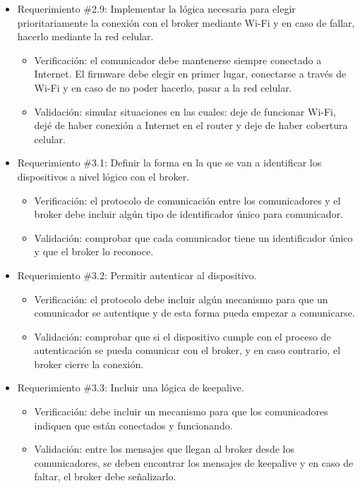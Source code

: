 \documentclass[
11pt, %
]{charter}
\begin{document}
\begin{itemize}
	\item Requerimiento \#2.9: Implementar la lógica necesaria para elegir prioritariamente la conexión con el broker mediante Wi-Fi y en caso de fallar, hacerlo mediante la red celular.
	\begin{itemize}
		\item Verificación: el comunicador debe mantenerse siempre conectado a Internet. El firmware debe elegir en primer lugar, conectarse a través de Wi-Fi y en caso de no poder hacerlo, pasar a la red celular.
		\item Validación: simular situaciones en las cuales: deje de funcionar Wi-Fi, dejé de haber conexión a Internet en el router y deje de haber cobertura celular.
	\end{itemize}
			
	\item Requerimiento \#3.1: Definir la forma en la que se van a identificar los dispositivos a nivel lógico con el broker.
	\begin{itemize}
		\item Verificación: el protocolo de comunicación entre los comunicadores y el broker debe incluir algún tipo de identificador único para comunicador.
		\item Validación: comprobar que cada comunicador tiene un identificador único y que el broker lo reconoce.
	\end{itemize}
			
	\item Requerimiento \#3.2: Permitir autenticar al dispositivo.
	\begin{itemize}
		\item Verificación: el protocolo debe incluir algún mecanismo para que un comunicador se autentique y de esta forma pueda empezar a comunicarse.
		\item Validación: comprobar que si el dispositivo cumple con el proceso de autenticación se pueda comunicar con el broker, y en caso contrario, el broker cierre la conexión.
	\end{itemize}
			
	\item Requerimiento \#3.3: Incluir una lógica de keepalive.
	\begin{itemize}
		\item Verificación: debe incluir un mecanismo para que los comunicadores indiquen que están conectados y funcionando.
		\item Validación: entre los mensajes que llegan al broker desde los comunicadores, se deben encontrar los mensajes de keepalive y en caso de faltar, el broker debe señalizarlo.
	\end{itemize}
			

\end{itemize}
\end{document}

